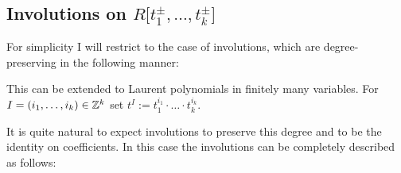 \subsection{Involutions on $R\lbrack t_1^\pm,\ldots,t_k^\pm\rbrack$}
For simplicity I will restrict to the case of involutions, which are degree-preserving in the following manner:


This can be extended to Laurent polynomials in finitely many variables. For $I=(i_1,\ldots, i_k) \in \mathbb{Z}^k$ set $t^I:=t_1^{i_1}\cdot\ldots\cdot t_k^{i_k}$.

It is quite natural to expect involutions to preserve this degree and to be the identity on coefficients. In this case the involutions can be completely described as follows:

